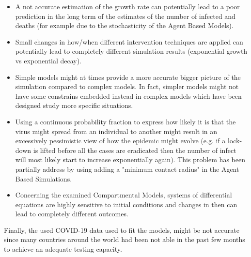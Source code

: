 \begin{itemize}
    \item A not accurate estimation of the growth rate can potentially lead to a poor prediction in the long term of the estimates of the number of infected and deaths (for example due to the stochasticity of the Agent Based Models).
    \item Small changes in how/when different intervention techniques are applied can potentially lead to completely different simulation results (exponential growth vs exponential decay).
    \item Simple models might at times provide a more accurate bigger picture of the simulation compared to complex models. In fact, simpler models might not have some constrains embedded instead in complex models which have been designed study more specific situations.
    \item Using a continuous probability fraction to express how likely it is that the virus might spread from an individual to another might result in an excessively pessimistic view of how the epidemic might evolve (e.g. if a lock-down is lifted before all the cases are eradicated then the number of infect will most likely start to increase exponentially again). This problem has been partially address by using adding a "minimum contact radius" in the Agent Based Simulations. 
    \item Concerning the examined Compartmental Models, systems of differential equations are highly sensitive to initial conditions and changes in then can lead to completely different outcomes.
\end{itemize}

Finally, the used COVID-19 data used to fit the models, might be not accurate since many countries around the world had been not able in the past few months to achieve an adequate testing capacity.
